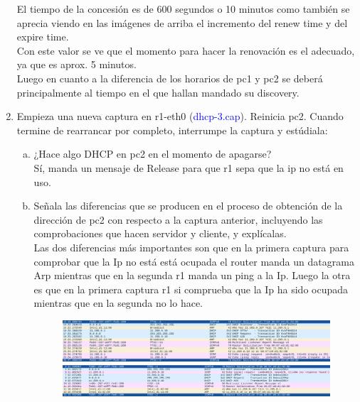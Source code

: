 \documentclass[12pt, a4paper]{report}
\begin{document}
\begin{enumerate}
	El tiempo de la concesión es de 600 segundos o 10 minutos como también se aprecia viendo en las imágenes de arriba el incremento del renew time y del expire time.\\
	Con este valor se ve que el momento para hacer la renovación es el adecuado, ya que es aprox. 5 minutos.\\
	Luego en cuanto a la diferencia de los horarios de pc1 y pc2 se deberá principalmente al tiempo en el que hallan mandado su discovery.
	\item Empieza una nueva captura en r1-eth0 (\textcolor{blue}{dhcp-3.cap}). Reinicia pc2. Cuando termine de rearrancar por
	completo, interrumpe la captura y estúdiala:
	\begin{enumerate}[a)]
		\item ¿Hace algo DHCP en pc2 en el momento de apagarse?\\
		
		Sí, manda un mensaje de Release para que r1 sepa que la ip no está en uso.
		\item Señala las diferencias que se producen en el proceso de obtención de la dirección de pc2 con respecto
		a la captura anterior, incluyendo las comprobaciones que hacen servidor y cliente, y explícalas.\\
		
		Las dos diferencias más importantes son que en la primera captura para comprobar que la Ip no está está ocupada el router manda un datagrama Arp mientras que en la segunda r1 manda un ping a la Ip. Luego la otra es que en la primera captura r1 si comprueba que la Ip ha sido ocupada mientras que en la segunda no lo hace.
		\begin{figure}[!h]
			\centering
			\includegraphics[width=\textwidth]{ej4_1_3}
			\includegraphics[width=\textwidth]{ej4_2_3}
		\end{figure}
	\end{enumerate}
\end{enumerate}
\end{document}
